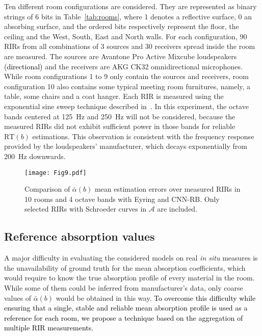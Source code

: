\documentclass[reprint]{JASA}
\begin{document}
Ten different room configurations are considered. They are represented as binary strings of 6 bits in Table~\ref{tab:rooms}, where 1 denotes a reflective surface, 0 an absorbing surface, and the ordered bits respectively represent the floor, the ceiling and the West, South, East and North walls. For each configuration, 90 RIRs from all combinations of 3 sources and 30 receivers spread inside the room are measured. The sources are Avantone Pro Active Mixcube loudspeakers \textcolor{black}{(directional)} and the receivers are AKG CK32 omnidirectional microphones. While room configurations 1 to 9 only contain the sources and receivers, room configuration 10 also contains some typical meeting room furnitures, namely, a table, some chairs and a coat hanger. Each RIR is measured using the exponential sine sweep technique described in~\cite{farina2007advancements}. In this experiment, the octave bands centered at 125~Hz and 250~Hz will not be considered, because the measured RIRs did not exhibit sufficient power in those bands for reliable $\textrm{RT}(b)$ estimations. This observation is consistent with the frequency response provided by the loudspeakers' manufacturer, which decays exponentially from 200~Hz downwards.

\begin{figure*}[!t]
	\centering
	\texttt{[image: Fig9.pdf]}
	\caption{Comparison of $\bar{\alpha}(b)$ mean estimation errors over measured RIRs in 10 rooms and 4 octave bands with Eyring and CNN-RB. Only selected RIRs with Schroeder curves in $\mathcal{A}$ are included.}
	\label{fig:real_results_all}
\end{figure*}

\subsection{Reference absorption values}
A major difficulty in evaluating the considered models on real \textit{in situ} measures is the unavailability of ground truth for the mean absorption coefficients, which would require to know the true absorption profile of every material in the room. While some of them could be inferred from manufacturer's data, only coarse values of $\bar{\alpha}(b)$ would be obtained in this way. 
\textcolor{black}{To overcome this difficulty while ensuring that a single, stable and reliable mean absorption profile is used as a reference for each room, we propose a technique based on the aggregation of multiple RIR measurements.}
\end{document}
